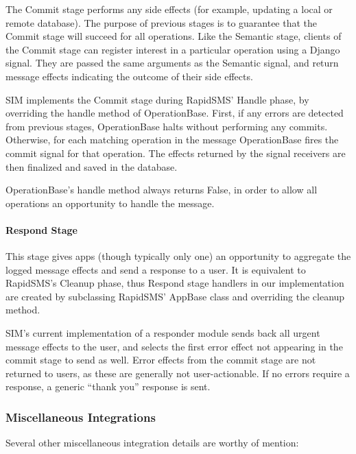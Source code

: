 \documentclass{acm_proc_article-sp}
\begin{document}
The Commit stage performs any side effects (for example, updating a local or remote database). The purpose of previous stages is to guarantee that the Commit stage will succeed for all operations. Like the Semantic stage, clients of the Commit stage can register interest in a particular operation using a Django signal. They are passed the same arguments as the Semantic signal, and return message effects indicating the outcome of their side effects.

SIM implements the Commit stage during RapidSMS' Handle phase, by overriding the handle method of OperationBase. First, if any errors are detected from previous stages, OperationBase halts without performing any commits. Otherwise, for each matching operation in the message OperationBase fires the commit signal for that operation. The effects returned by the signal receivers are then finalized and saved in the database.

OperationBase's handle method always returns False, in order to allow all operations an opportunity to handle the message.

\paragraph{Respond Stage}

This stage gives apps (though typically only one) an opportunity to aggregate the logged message effects and send a response to a user. It  is equivalent to RapidSMS's Cleanup phase, thus Respond stage handlers in our implementation are created by subclassing RapidSMS' AppBase class and overriding the cleanup method.

SIM's current implementation of a responder module sends back all urgent message effects to the user, and selects the first error effect not appearing in the commit stage to send as well. Error effects from the commit stage are not returned to users, as these are generally not user-actionable. If no errors require a response, a generic “thank you” response is sent.

\subsubsection{Miscellaneous Integrations}

Several other miscellaneous integration details are worthy of mention:
\end{document}
